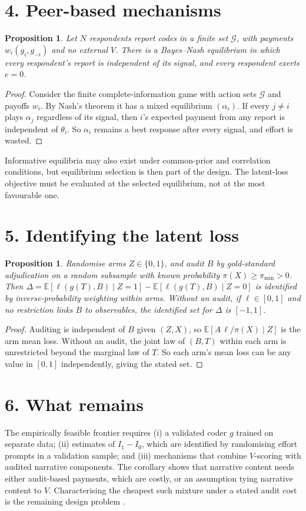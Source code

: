 \documentclass[11pt]{article}
\newtheorem{proposition}[theorem]{Proposition}
\theoremstyle{definition}
\begin{document}
\section*{4. Peer-based mechanisms}
\begin{proposition}\label{prop:peer}
Let $N$ respondents report codes in a finite set $\mathcal G$, with payments $w_i(g_i,g_{-i})$ and no external $V$. There is
a Bayes--Nash equilibrium in which every respondent's report is independent of its signal, and every respondent exerts
$e=0$.
\end{proposition}
\begin{proof}
Consider the finite complete-information game with action sets $\mathcal G$ and payoffs $w_i$. By Nash's theorem it has a
mixed equilibrium $(\alpha_i)$. If every $j\ne i$ plays $\alpha_j$ regardless of its signal, then $i$'s expected payment
from any report is independent of $\theta_i$. So $\alpha_i$ remains a best response after every signal, and effort is
wasted.
\end{proof}
Informative equilibria may also exist under common-prior and correlation conditions, but equilibrium selection is then part of
the design. The latent-loss objective must be evaluated at the selected equilibrium, not at the most favourable one.

\section*{5. Identifying the latent loss}
\begin{proposition}\label{prop:audit}
Randomise arms $Z\in\{0,1\}$, and audit $B$ by gold-standard adjudication on a random subsample with known probability
$\pi(X)\ge\pi_{\min}>0$. Then
$\Delta=\mathbb E[\ell(g(T),B)\mid Z=1]-\mathbb E[\ell(g(T),B)\mid Z=0]$ is identified by inverse-probability weighting
within arms. Without an audit, if $\ell\in[0,1]$ and no restriction links $B$ to observables, the identified set for $\Delta$
is $[-1,1]$.
\end{proposition}
\begin{proof}
Auditing is independent of $B$ given $(Z,X)$, so $\mathbb E[A\,\ell/\pi(X)\mid Z]$ is the arm mean loss. Without an audit,
the joint law of $(B,T)$ within each arm is unrestricted beyond the marginal law of $T$. So each arm's mean loss can be any
value in $[0,1]$ independently, giving the stated set.
\end{proof}

\section*{6. What remains}
The empirically feasible frontier requires (i) a validated coder $g$ trained on separate data; (ii) estimates of $I_1-I_0$,
which are identified by randomising effort prompts in a validation sample; and (iii) mechanisms that combine $V$-scoring
with audited narrative components. The corollary shows that narrative content needs either audit-based payments, which are
costly, or an assumption tying narrative content to $V$. Characterising the cheapest such mixture under a stated audit
cost is the remaining design problem \cite{hrsw}.
\end{document}
